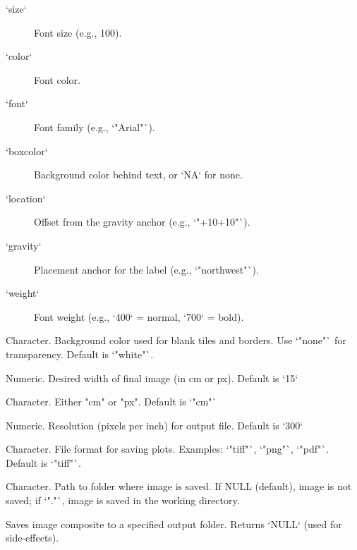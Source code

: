 \documentclass[a4paper]{book}
\begin{document}
\begin{Arguments}
\begin{ldescription}
\begin{description}
\item[`size`] Font size (e.g., 100).
\item[`color`] Font color.
\item[`font`] Font family (e.g., `"Arial"`).
\item[`boxcolor`] Background color behind text, or `NA` for none.
\item[`location`] Offset from the gravity anchor (e.g., `"+10+10"`).
\item[`gravity`] Placement anchor for the label (e.g., `"northwest"`).
\item[`weight`] Font weight (e.g., `400` = normal, `700` = bold).

\end{description}


\item[\code{background\_color}] Character. Background color used for blank tiles and borders. Use `"none"` for transparency. Default is `"white"`.

\item[\code{desired\_width}] Numeric. Desired width of final image (in cm or px). Default is `15`

\item[\code{width\_unit}] Character. Either "cm" or "px". Default is `"cm"`

\item[\code{ppi}] Numeric. Resolution (pixels per inch) for output file. Default is `300`

\item[\code{output\_format}] Character. File format for saving plots. Examples: `"tiff"`, `"png"`, `"pdf"`. Default is `"tiff"`.

\item[\code{output\_folder}] Character. Path to folder where image is saved. If NULL (default), image is not saved; if `"."`, image is saved in the working directory.
\end{ldescription}
\end{Arguments}
%
\begin{Value}
Saves image composite to a specified output folder. Returns `NULL` (used for side-effects).
\end{Value}
%
\end{document}
